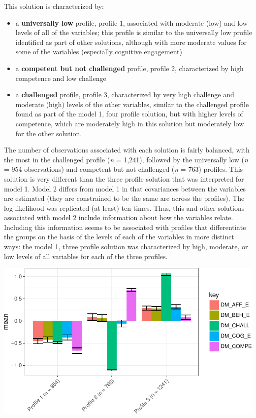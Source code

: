 \documentclass[]{msu-thesis}
\providecommand{\tightlist}{%
  \setlength{\itemsep}{0pt}\setlength{\parskip}{0pt}}
\theoremstyle{definition}
\theoremstyle{definition}
\theoremstyle{definition}
\theoremstyle{remark}
\begin{document}
This solution is characterized by:

\begin{itemize}
\tightlist
\item
  a \textbf{universally low} profile, profile 1, associated with
  moderate (low) and low levels of all of the variables; this profile is
  similar to the universally low profile identified as part of other
  solutions, although with more moderate values for some of the
  variables (especially cognitive engagement)
\item
  a \textbf{competent but not challenged} profile, profile 2,
  characterized by high competence and low challenge
\item
  a \textbf{challenged} profile, profile 3, characterized by very high
  challenge and moderate (high) levels of the other variables, similar
  to the challenged profile found as part of the model 1, four profile
  solution, but with higher levels of competence, which are moderately
  high in this solution but moderately low for the other solution.
\end{itemize}

The number of observations associated with each solution is fairly
balanced, with the most in the challenged profile (\emph{n} = 1,241),
followed by the universally low (\emph{n} = 954 observations) and
competent but not challenged (\emph{n} = 763) profiles. This solution is
very different than the three profile solution that was interpreted for
model 1. Model 2 differs from model 1 in that covariances between the
variables are estimated (they are constrained to be the same are across
the profiles). The log-likelihood was replicated (at least) ten times.
Thus, this and other solutions associated with model 2 include
information about how the variables relate. Including this information
seems to be associated with profiles that differentiate the groups on
the basis of the levels of each of the variables in more distinct ways:
the model 1, three profile solution was characterized by high, moderate,
or low levels of all variables for each of the three profiles.

\begin{center}\includegraphics[width=0.8\linewidth]{rosenberg-dissertation_files/figure-latex/m2_3p-1} \end{center}
\end{document}
